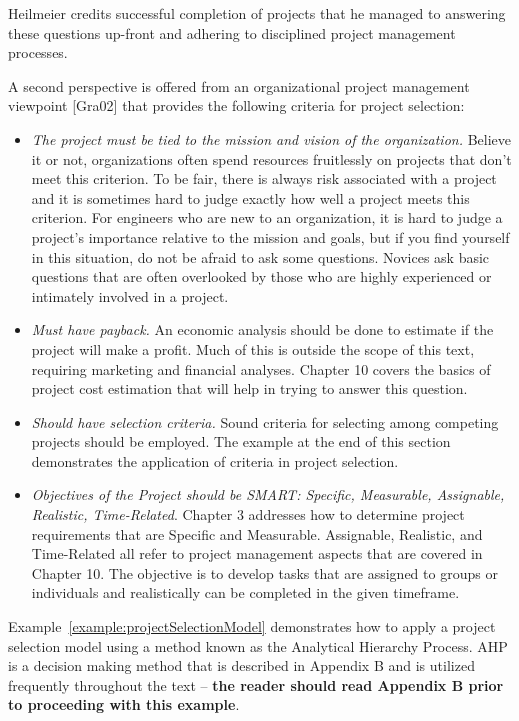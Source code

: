 Heilmeier credits successful completion of projects that he managed to
answering these questions up-front and adhering to disciplined project
management processes.

A second perspective is offered from an organizational project
management viewpoint {[}Gra02{]} that provides the following criteria
for project selection:

\begin{itemize}
\item
  \emph{The project must be tied to the mission and vision of the
  organization.} Believe it or not, organizations often spend resources
  fruitlessly on projects that don't meet this criterion. To be fair,
  there is always risk associated with a project and it is sometimes
  hard to judge exactly how well a project meets this criterion. For
  engineers who are new to an organization, it is hard to judge a
  project's importance relative to the mission and goals, but if you
  find yourself in this situation, do not be afraid to ask some
  questions. Novices ask basic questions that are often overlooked by
  those who are highly experienced or intimately involved in a project.
\item
  \emph{Must have payback.} An economic analysis should be done to
  estimate if the project will make a profit. Much of this is outside
  the scope of this text, requiring marketing and financial analyses.
  Chapter 10 covers the basics of project cost estimation that will help
  in trying to answer this question.
\item
  \emph{Should have selection criteria.} Sound criteria for selecting
  among competing projects should be employed. The example at the end of
  this section demonstrates the application of criteria in project
  selection.
\end{itemize}

\begin{itemize}
\item
  \emph{Objectives of the Project should be SMART: Specific, Measurable,
  Assignable, Realistic, Time-Related}. Chapter 3 addresses how to
  determine project requirements that are Specific and Measurable.
  Assignable, Realistic, and Time-Related all refer to project
  management aspects that are covered in Chapter 10. The objective is to
  develop tasks that are assigned to groups or individuals and
  realistically can be completed in the given timeframe.
\end{itemize}

Example~\ref{example:projectSelectionModel} demonstrates how to apply a project selection
model using a method known as the Analytical Hierarchy Process. AHP is a
decision making method that is described in Appendix B and is utilized
frequently throughout the text -- \textbf{the reader should read
Appendix B prior to proceeding with this example}.

